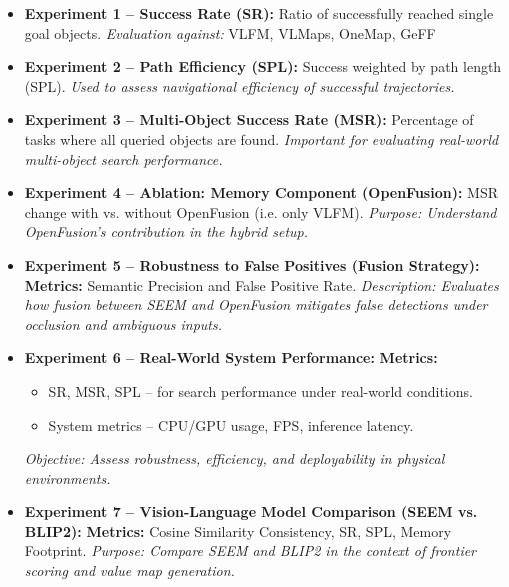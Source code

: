 \begin{itemize}
    \item \textbf{Experiment 1 – Success Rate (SR):}  
    Ratio of successfully reached single goal objects.  
    \textit{Evaluation against:} \ac{VLFM}, \ac{VLMaps}, \ac{OneMap}, \ac{GeFF}

    \item \textbf{Experiment 2 – Path Efficiency (SPL):}  
    Success weighted by path length (SPL).  
    \textit{Used to assess navigational efficiency of successful trajectories.}

    \item \textbf{Experiment 3 – Multi-Object Success Rate (MSR):}  
    Percentage of tasks where all queried objects are found.  
    \textit{Important for evaluating real-world multi-object search performance.}

    \item \textbf{Experiment 4 – Ablation: Memory Component (OpenFusion):}  
    MSR change with vs. without OpenFusion (i.e. only \ac{VLFM}).  
    \textit{Purpose: Understand OpenFusion’s contribution in the hybrid setup.}

    \item \textbf{Experiment 5 – Robustness to False Positives (Fusion Strategy):}  
    \textbf{Metrics:} Semantic Precision and False Positive Rate.  
    \textit{Description: Evaluates how fusion between \ac{SEEM} and OpenFusion mitigates false detections under occlusion and ambiguous inputs.}

    \item \textbf{Experiment 6 – Real-World System Performance:}  
    \textbf{Metrics:}
    \begin{itemize}
        \item SR, MSR, SPL – for search performance under real-world conditions.
        \item System metrics – CPU/GPU usage, FPS, inference latency.
    \end{itemize}
    \textit{Objective: Assess robustness, efficiency, and deployability in physical environments.}

    \item \textbf{Experiment 7 – Vision-Language Model Comparison (SEEM vs. BLIP2):}  
    \textbf{Metrics:} Cosine Similarity Consistency, SR, SPL, Memory Footprint.  
    \textit{Purpose: Compare SEEM and BLIP2 in the context of frontier scoring and value map generation.}
\end{itemize}